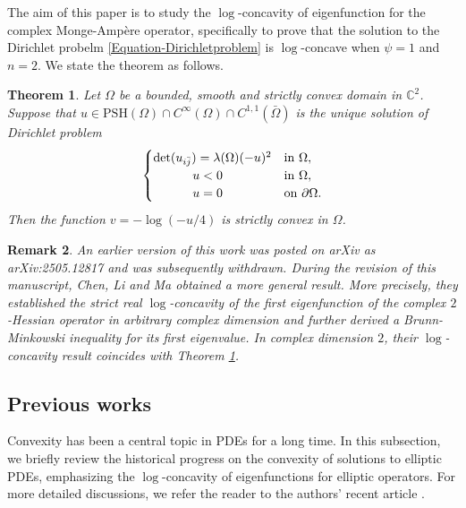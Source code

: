 \documentclass[11pt]{amsart}
\newtheorem{theorem}{Theorem}
\newtheorem{remark}[theorem]{Remark}
\numberwithin{theorem}{section}
\numberwithin{equation}{section}
\begin{document}
The aim of this paper is to study the $\log$-concavity of eigenfunction for the complex Monge-Amp\`{e}re operator, specifically to prove that the solution to the Dirichlet probelm \eqref{Equation-Dirichletproblem} is $\log$-concave when $\psi=1$ and $n=2$. We state the theorem as follows.
\begin{theorem}\label{Theorem-Main}
Let $\Omega$ be a bounded, smooth and strictly convex domain in $\mathbb{C}^2$. Suppose that $u\in\mathrm{PSH}(\Omega)\cap C^\infty(\Omega)\cap C^{1,1}(\bar{\Omega})$ is the unique solution of Dirichlet problem
\begin{equation}\label{Equ:EVP-u}
\begin{cases}
\det(u_{i\bar{j}})=\lambda(\Omega)(-u)^2 & \mathrm{in}\ \Omega,\\
\hspace{11mm}u<0 & \mathrm{in}\ \Omega,\\
\hspace{11mm}u=0 & \mathrm{on}\ \partial\Omega.
\end{cases}
\end{equation}
Then the function $v=-\log(-u/4)$ is strictly convex in $\Omega$.
\end{theorem}
\begin{remark}
An earlier version of this work was posted on arXiv as 	arXiv:2505.12817 and was subsequently withdrawn. During the revision of this manuscript, Chen, Li and Ma \cite{Chen-Li-Ma2026} obtained a more general result. More precisely, they established the strict real $\log$-concavity of the first eigenfunction of the complex $2$-Hessian operator in arbitrary complex dimension and further derived a Brunn-Minkowski inequality for its first eigenvalue. In complex dimension $2$, their $\log$-concavity result coincides with Theorem \ref{Theorem-Main}.
\end{remark}

\subsection{Previous works}
Convexity has been a central topic in PDEs for a long time. In this subsection, we briefly review the historical progress on the convexity of solutions to elliptic PDEs, emphasizing the $\log$-concavity of eigenfunctions for elliptic operators. For more detailed discussions, we refer the reader to the authors' recent article \cite{Zhang-Zhou2025}. 
\end{document}
